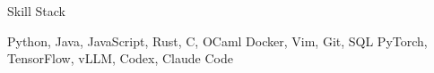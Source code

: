 \begin{rubric}{Skill Stack}

	Python, Java, JavaScript, Rust, C, OCaml
\entry*[Common]
        Docker, Vim, Git, SQL
	PyTorch, TensorFlow, vLLM, Codex, Claude Code
\end{rubric}
